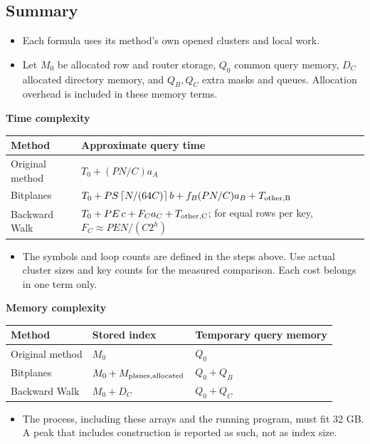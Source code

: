 \subsection{Summary}
\begin{itemize}
\item Each formula uses its method's own opened clusters and local work.
\item Let $M_0$ be allocated row and router storage, $Q_0$ common query memory, $D_C$ allocated directory memory, and $Q_B,Q_C$ extra masks and queues. Allocation overhead is included in these memory terms.
\end{itemize}

\textbf{Time complexity}\par
{\small\noindent
\begin{tabularx}{\linewidth}{@{}lY@{}}\toprule
Method & Approximate query time\\\midrule
Original method & $T_0+(PN/C)a_A$\\
Bitplanes & $T_0+PS\left\lceil N/(64C)\right\rceil b+f_B(PN/C)a_B+T_{\rm other,B}$\\
Backward Walk & $T_0+PE\,c+F_Ca_C+T_{\rm other,C}$; for equal rows per key, $F_C\approx PEN/(C2^h)$\\\bottomrule
\end{tabularx}\par}
\begin{itemize}
\item The symbols and loop counts are defined in the steps above. Use actual cluster sizes and key counts for the measured comparison. Each cost belongs in one term only.
\end{itemize}

\textbf{Memory complexity}\par
{\small\noindent
\begin{tabular}{@{}lll@{}}\toprule
Method & Stored index & Temporary query memory\\\midrule
Original method & $M_0$ & $Q_0$\\
Bitplanes & $M_0+M_{\rm planes,allocated}$ & $Q_0+Q_B$\\
Backward Walk & $M_0+D_C$ & $Q_0+Q_C$\\\bottomrule
\end{tabular}\par}
\begin{itemize}
\item The process, including these arrays and the running program, must fit 32 GB. A peak that includes construction is reported as such, not as index size.
\end{itemize}

